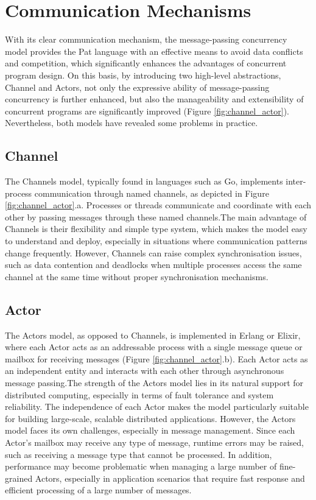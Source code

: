 \documentclass{l4proj}
\begin{document}
\section{Communication Mechanisms}
With its clear communication mechanism, the message-passing concurrency model provides the Pat language with an effective means to avoid data conflicts and competition, which significantly enhances the advantages of concurrent program design. On this basis, by introducing two high-level abstractions, Channel and Actors, not only the expressive ability of message-passing concurrency is further enhanced, but also the manageability and extensibility of concurrent programs are significantly improved (Figure \ref{fig:channel_actor}). Nevertheless, both models have revealed some problems in practice.

\subsection{Channel}
The Channels model, typically found in languages such as Go, implements inter-process communication through named channels, as depicted in Figure \ref{fig:channel_actor}.a. Processes or threads communicate and coordinate with each other by passing messages through these named channels.The main advantage of Channels is their flexibility and simple type system, which makes the model easy to understand and deploy, especially in situations where communication patterns change frequently. However, Channels can raise complex synchronisation issues, such as data contention and deadlocks when multiple processes access the same channel at the same time without proper synchronisation mechanisms.

\subsection{Actor}
The Actors model, as opposed to Channels, is implemented in Erlang or Elixir, where each Actor acts as an addressable process with a single message queue or mailbox for receiving messages (Figure \ref{fig:channel_actor}.b). Each Actor acts as an independent entity and interacts with each other through asynchronous message passing.The strength of the Actors model lies in its natural support for distributed computing, especially in terms of fault tolerance and system reliability. The independence of each Actor makes the model particularly suitable for building large-scale, scalable distributed applications. However, the Actors model faces its own challenges, especially in message management. Since each Actor's mailbox may receive any type of message, runtime errors may be raised, such as receiving a message type that cannot be processed. In addition, performance may become problematic when managing a large number of fine-grained Actors, especially in application scenarios that require fast response and efficient processing of a large number of messages.
\end{document}
